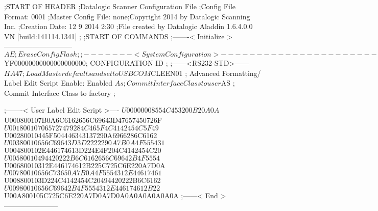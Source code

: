 ;START OF HEADER
;Datalogic Scanner Configuration File
;Config File Format: 0001
;Master Config File: none;Copyright 2014 by Datalogic Scanning Inc.
;Creation Date: 12 9 2014 2:30
;File created by Datalogic Aladdin 1.6.4.0.0 VN [build:141114.1341]
;
;START OF COMMANDS
;-------< Initialize >-----------------------------
$AE                 ; Erase Config Flash
;
;-------< System Configuration >-------------------------------
$YF00000000000000000000; CONFIGURATION ID
;
;------<RS232-STD>------
$HA47              ; Load Master defaults and set to USBCOM
$CLEEN01            ; Advanced Formatting/ Label Edit Script Enable: Enabled
$As                 ; Commit Interface Class to user
$AS                 ; Commit Interface Class to factory
;

;-------< User Label Edit Script >----
$U00000008554C453200B20A0A
$U000800107B0A6C6162656C69643D47657450726F
$U001800107065727479284C465F4C4142454C5F49
$U00280010445F504446343137290A6966286C6162
$U00380010656C69643D3D2222290A7B0A4F555431
$U004800102E446174613D224E4F204C4142454C20
$U00580010494420222B6C6162656C69642B4F5554
$U00680010312E446174612B225C725C6E220A7D0A
$U00780010656C73650A7B0A4F5554312E44617461
$U008800103D224C4142454C20494420222B6C6162
$U00980010656C69642B4F5554312E446174612B22
$U00A800105C725C6E220A7D0A7D0A0A0A0A0A0A0A
;------< End >-----------------------
